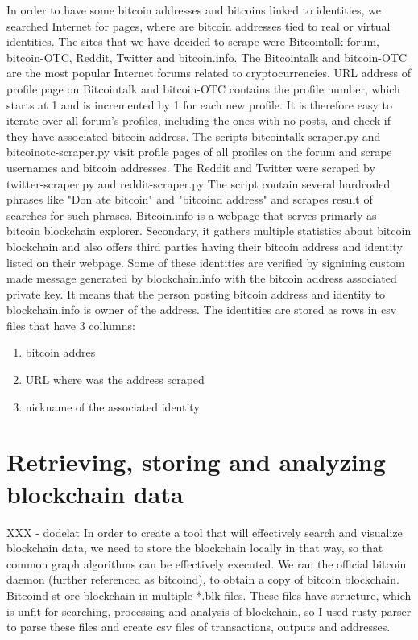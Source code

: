 \documentclass[
  digital, %
  table,   %
  lof,     %
  lot,     %
  oneside
]{fithesis3}
\begin{document}
In order to have some bitcoin addresses and bitcoins linked to identities,
we searched Internet for pages, where are bitcoin addresses tied to real or virtual identities.
The sites that we have decided to scrape were Bitcointalk forum, bitcoin-OTC, Reddit,
Twitter and bitcoin.info.
The Bitcointalk and bitcoin-OTC are the most popular Internet forums
related to cryptocurrencies. URL address of profile page on Bitcointalk
and bitcoin-OTC contains the profile number, which starts at 1 and is  incremented by 1
for each new profile. 
It is therefore easy to iterate over all forum's profiles,
including the ones with no posts, and check if they have associated bitcoin address.
The scripts bitcointalk-scraper.py and bitcoinotc-scraper.py
visit profile pages of all profiles on the forum and scrape usernames and bitcoin addresses. 
The Reddit and Twitter were scraped by twitter-scraper.py and reddit-scraper.py
The script contain several hardcoded phrases like "Don
ate bitcoin" and "bitcoind address" and scrapes 
result of searches for such phrases.
Bitcoin.info is a webpage that serves primarly as bitcoin blockchain explorer. Secondary,
it gathers multiple statistics about bitcoin blockchain and also offers
third parties having their bitcoin address and identity listed on their webpage.
Some of these identities are verified by signining
custom made message generated by blockchain.info
with the bitcoin address associated private key. It means that the person
posting bitcoin address and identity to blockchain.info is owner of the address.
The identities are stored as rows in csv files that have 3 collumns:

\begin{enumerate}
 \item bitcoin addres
 \item URL where was the address scraped
 \item nickname of the associated identity
\end{enumerate}

\section{Retrieving, storing and analyzing blockchain data}
XXX - dodelat
In order to create a tool that will effectively search and visualize blockchain data,
we need to store the blockchain locally in that way, so that common graph algorithms can be effectively executed.
We ran the official bitcoin daemon (further referenced as bitcoind), to obtain a copy of bitcoin blockchain. Bitcoind st
ore blockchain in multiple *.blk files.
These files have structure, which is unfit for searching, processing and analysis of blockchain, so I used rusty-parser 
to parse these files and create csv files of transactions, outputs and addresses.
\end{document}
